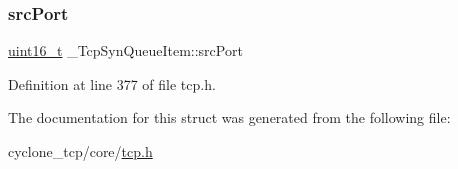\subsubsection{\texorpdfstring{src\+Port}{srcPort}}
{\footnotesize\ttfamily \hyperlink{stdint_8h_a273cf69d639a59973b6019625df33e30}{uint16\+\_\+t} \+\_\+\+Tcp\+Syn\+Queue\+Item\+::src\+Port}



Definition at line 377 of file tcp.\+h.



The documentation for this struct was generated from the following file\+:\begin{DoxyCompactItemize}
\item 
cyclone\+\_\+tcp/core/\hyperlink{tcp_8h}{tcp.\+h}\end{DoxyCompactItemize}
